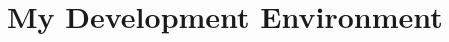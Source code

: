 \documentclass[11pt,a4paper]{report}
\theoremstyle{definitionstyle}
\begin{document}
%
%
%
%
%
%
%
\section{My Development Environment}
\end{document}
